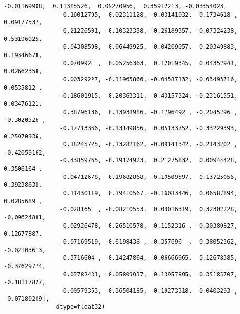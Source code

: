 \documentclass[11pt]{article}
\begin{document}
\begin{Verbatim}[commandchars=\\\{\}]
                -0.01169908,  0.11385526,  0.09270956,  0.35912213, -0.03354023,
                -0.16012795,  0.02311128, -0.03141032, -0.1734618 ,  0.09177537,
                -0.21226501, -0.10323358, -0.26189357, -0.07324238,  0.53196925,
                -0.04308598, -0.06449925,  0.04209057,  0.20349883,  0.19346678,
                 0.070992  ,  0.05256363,  0.12019345,  0.04352941,  0.02662358,
                 0.00329227, -0.11965866, -0.04587132, -0.03493716,  0.0535812 ,
                -0.18601915,  0.20363311, -0.43157324, -0.23161551,  0.03476121,
                 0.38796136,  0.13938986, -0.1796492 , -0.2045296 , -0.3020526 ,
                -0.17713366, -0.13149856,  0.05133752, -0.33229393,  0.25970936,
                 0.18245725, -0.13282162, -0.09141342, -0.2143202 , -0.42059162,
                -0.43859765, -0.19174923,  0.21275832,  0.00944428,  0.3506164 ,
                 0.04712678,  0.19682868, -0.19509597,  0.13725056,  0.39238638,
                 0.11430119,  0.19410567, -0.16083446,  0.06587894,  0.0285689 ,
                -0.028165  , -0.08210553,  0.03016319,  0.32302228, -0.09624881,
                 0.02926478, -0.26510578,  0.1152316 , -0.30380827,  0.12677887,
                -0.07169519, -0.6198438 , -0.357696  ,  0.38052362, -0.02103613,
                 0.3716604 ,  0.14247864, -0.06666965,  0.12678385, -0.37629774,
                 0.03782431, -0.05809937,  0.13957895, -0.35185707, -0.18117827,
                 0.00579353, -0.36504185,  0.19273318,  0.0403293 , -0.07180209],
               dtype=float32)
\end{Verbatim}
            
\end{document}
